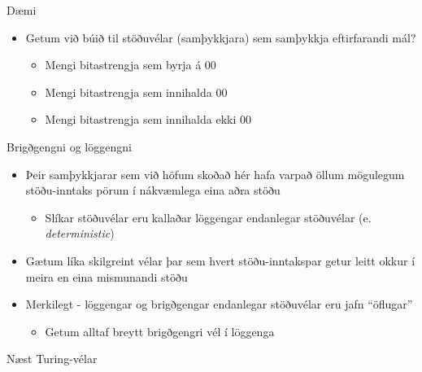 \documentclass{beamer}
\begin{document}
\begin{frame}{Dæmi}
\begin{itemize}
 \item Getum við búið til stöðuvélar (samþykkjara) sem samþykkja eftirfarandi mál?
 \begin{itemize}
  \item Mengi bitastrengja sem byrja á 00
  \item Mengi bitastrengja sem innihalda 00
  \item Mengi bitastrengja sem innihalda ekki 00
 \end{itemize}
\end{itemize}
\end{frame}

\begin{frame}{Brigðgengni og löggengni}
\begin{itemize}
 \item Þeir samþykkjarar sem við höfum skoðað hér hafa varpað öllum mögulegum stöðu-inntaks pörum í nákvæmlega eina aðra stöðu
 \begin{itemize}
  \item Slíkar stöðuvélar eru kallaðar löggengar endanlegar stöðuvélar (e. \emph{deterministic})
 \end{itemize}
 \item Gætum líka skilgreint vélar þar sem hvert stöðu-inntakspar getur leitt okkur í meira en eina mismunandi stöðu
 \item Merkilegt - löggengar og brigðgengar endanlegar stöðuvélar eru jafn ``öflugar''
 \begin{itemize}
  \item Getum alltaf breytt brigðgengri vél í löggenga
 \end{itemize}
\end{itemize}
\end{frame}

\begin{frame}{Næst}
Turing-vélar
\end{frame}
\end{document}
